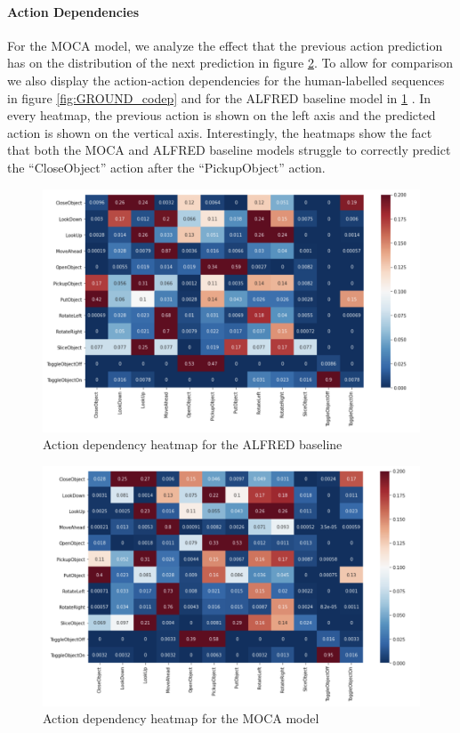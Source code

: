 \documentclass[11pt,a4paper]{article}
\begin{document}
\paragraph{Action Dependencies}

 For the MOCA model, we analyze the effect that the previous action prediction has on the distribution of the next prediction in figure \ref{fig:MOCA_codep}. To allow for comparison we also display the action-action dependencies for the human-labelled sequences in figure  \ref{fig:GROUND_codep} and for the ALFRED baseline model in \ref{fig:ALFRED_codep} . In every heatmap, the previous action is shown on the left axis and the predicted action is shown on the vertical axis. Interestingly, the heatmaps show the fact that both the MOCA and ALFRED baseline models struggle to correctly predict the ``CloseObject'' action after the ``PickupObject'' action. 
 
  \begin{figure}
    \centering
    \includegraphics[width=\linewidth]{Reports/4-Analysis-of-Baselines/ALFRED_codep.png}
    \caption{Action dependency heatmap for the ALFRED baseline}
    \label{fig:ALFRED_codep}
\end{figure}
 
 \begin{figure}
    \centering
    \includegraphics[width=\linewidth]{Reports/4-Analysis-of-Baselines/MOCA_codep.png}
    \caption{Action dependency heatmap for the MOCA model}
    \label{fig:MOCA_codep}
\end{figure}
\end{document}
